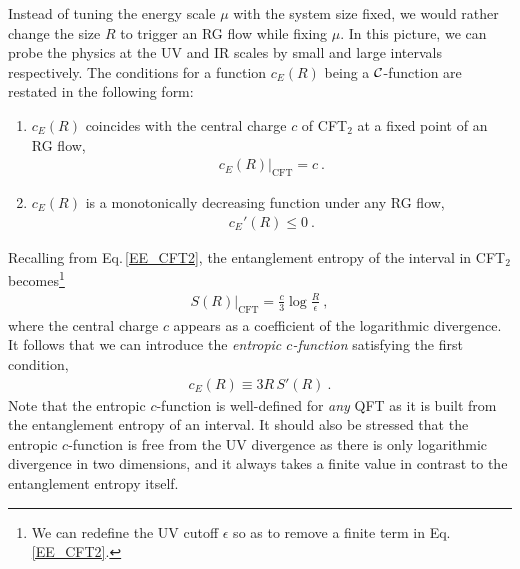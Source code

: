 Instead of tuning the energy scale $\mu$ with the system size fixed, 
we would rather change the size $R$ to trigger an RG flow while fixing $\mu$.
In this picture, we can probe the physics at the UV and IR scales by small and large intervals respectively.
The conditions for a function $c_E(R)$ being a ${\cal C}$-function are restated in the following form:
\begin{enumerate}
\item $c_E(R)$ coincides with the central charge $c$ of CFT$_2$ at a fixed point of an RG flow,
	\begin{align}
		c_E(R) |_\text{CFT} = c \ .
	\end{align}
\item $c_E(R)$ is a monotonically decreasing function under any RG flow,
	\begin{align}\label{EntropicMonotonicity}
		c_E'(R)\le 0 \ .
	\end{align}
\end{enumerate}
Recalling from Eq.\,\eqref{EE_CFT2}, the entanglement entropy of the interval in CFT$_2$ becomes\footnote{We can redefine the UV cutoff $\epsilon$ so as to remove a finite term in Eq.\,\eqref{EE_CFT2}.}
\begin{align}
S(R)|_\text{CFT} = \frac{c}{3}\log \frac{R}{\epsilon} \ ,
\end{align}
where the central charge $c$ appears as a coefficient of the logarithmic divergence.
It follows that we can introduce the \emph{entropic $c$-function} \cite{Casini:2004bw} satisfying the first condition,
\begin{align}\label{Entropic_C}
c_E(R) \equiv 3R\, S'(R) \ .
\end{align}
Note that the entropic $c$-function is well-defined for \emph{any} QFT as it is built from the entanglement entropy of an interval.
It should also be stressed that the entropic $c$-function is free from the UV divergence as there is only logarithmic divergence in two dimensions, and it always takes a finite value in contrast to the entanglement entropy itself.

